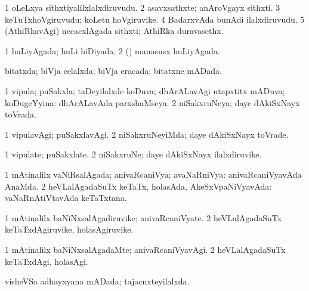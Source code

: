 \bentry
{} 
\gl{\nA}
\expl{}
\bmng
\bnum
\num{1} oLeLxya sithxtiyalilxlalxdiruvudu. 
\num{2} asavxsathxte; anAroVgayx sithxti. 
\num{3} keTuTxhoVgiruvudu; koLetu hoVgiruvike. 
\num{4} BadarxvAda bunAdi ilalxdiruvudu. 
\num{5} (AthiRkavAgi) necacxlAgada sithxti; AthiRka duravasethx. 
\enum
\emng
\eentry

\bentry
{} 
\gl{\gu}
\expl{}
\bmng
\bnum
\num{1} huLiyAgada; huLi hiDiyada. 
\num{2} (\rUpa) manasusx huLiyAgada. 
\enum
\emng
\eentry

\bentry
{} 
\gl{\gu}
\expl{}
\bmng
bitatxda; biVja celalxda; biVja eracada; bitatxne mADada. 
\emng
\eentry

\bentry
{} 
\gl{\gu}
\expl{}
\bmng
\bnum
\num{1} vipula; puSakxla; taDeyilalxde koDuva; dhArALavAgi utapxtitx mADuva; koDugeYyina:  dhArALavAda parxshaMseya. 
\num{2} niSakxruNeya; daye dAkiSxNayx toVrada. 
\enum
\emng
\eentry

\bentry
{} 
\gl{\kirxvi}
\bmng
\bnum
\num{1} vipulavAgi; puSakxlavAgi. 
\num{2} niSakxruNeyiMda; daye dAkiSxNayx toVrade. 
\enum
\emng
\eentry

\bentry
{} 
\gl{\nA}
\expl{}
\bmng
\bnum
\num{1} vipulate; puSakxlate. 
\num{2} niSakxruNe; daye dAkiSxNayx ilalxdiruvike. 
\enum
\emng
\eentry

\bentry
{} 
\gl{\gu}
\expl{}
\bmng
\bnum
\num{1} mAtinalilx vaNiRsalAgada; anivaRcaniVya; avaNaRniVya:  anivaRcaniVyavAda AnaMda. 
\num{2} heVLalAgadaSuTx keTaTx, holasAda, AkeSxVpaNiVyavAda:  vaNaRnAtiVtavAda keTaTxtana. 
\enum
\emng
\eentry

\bentry
{} 
\gl{\nA}
\expl{}
\bmng
\bnum
\num{1} mAtinalilx baNiNxsalAgadiruvike; anivaRcaniVyate. 
\num{2} heVLalAgadaSuTx keTaTxdAgiruvike, holasAgiruvike. 
\enum
\emng
\eentry

\bentry
{} 
\gl{\kirxvi}
\bmng
\bnum
\num{1} mAtinalilx baNiNxsalAgadaMte; anivaRcaniVyavAgi. 
\num{2} heVLalAgadaSuTx keTaTxdAgi, holasAgi. 
\enum
\emng
\eentry

\bentry
{} 
\gl{\gu}
\expl{}
\bmng
visheVSa adhayxyana mADada; tajacnxteyilalxda. 
\emng
\eentry

